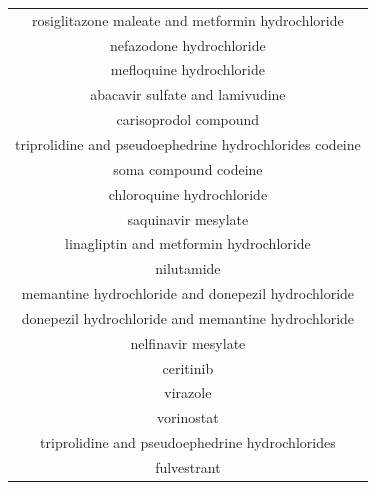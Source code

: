 \documentclass{article}
\newcommand{\lgc}[1]{\cellcolor[gray]{0.85}#1}
\begin{document}
\begin{table}[t!]
\begin{tabular}[t]{c}
rosiglitazone maleate and metformin hydrochloride \\
nefazodone hydrochloride \\
\lgc{mefloquine hydrochloride\cite{Weston2020.03.25.008482}} \\
abacavir sulfate and lamivudine \\
carisoprodol compound \\
triprolidine and pseudoephedrine hydrochlorides codeine \\
soma compound codeine \\
\lgc{chloroquine hydrochloride\cite{wang2020remdesivir}} \\
saquinavir mesylate \\
linagliptin and metformin hydrochloride \\
nilutamide \\
memantine hydrochloride and donepezil hydrochloride \\
donepezil hydrochloride and memantine hydrochloride \\
\lgc{nelfinavir mesylate\cite{Xu2020.01.27.921627}} \\
ceritinib \\
virazole \\
vorinostat \\
triprolidine and pseudoephedrine hydrochlorides \\
fulvestrant \\
\hline
\end{tabular}
\end{table}
\end{document}
